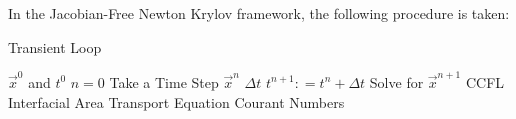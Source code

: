 In the Jacobian-Free Newton Krylov framework, the following procedure is taken:

%
%
%
%
%

\begin{algo}
\setlength{\baselineskip}{0.625\baselineskip}
\label{TransientLoop}
\caption{Transient Loop}
\begin{algorithmic}[1]
\Require $\Vec{x}^{0}$ and $t^{0}$
\Set $n = 0$
\Loop \; Take a Time Step
    \Set $\vec{x}^{n}$        
    \Calculate $\Delta t$ 
    \State $t^{n+1} : = t^{n} + \Delta t$
    \BlackBox Solve for $\vec{x}^{n+1}$ 
    \Test CCFL 
    \BlackBox Interfacial Area Transport Equation
    \Calculate Courant Numbers 
\end{algorithmic}
\end{algo}

